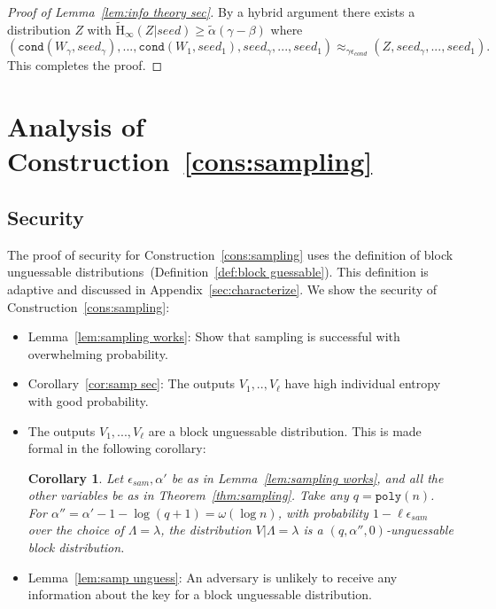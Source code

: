 \documentclass[11pt]{article}
\newcommand{\apref}[1]{\mbox{Appendix~\ref{#1}}}
\newcommand{\thref}[1]{\mbox{Theorem~\ref{#1}}}
\newcommand{\defref}[1]{\mbox{Definition~\ref{#1}}}
\newcommand{\corref}[1]{\mbox{Corollary~\ref{#1}}}
\newcommand{\lemref}[1]{\mbox{Lemma~\ref{#1}}}
\newcommand{\consref}[1]{\mbox{Construction~\ref{#1}}}
\newcommand{\class}[1]{{\ensuremath{\mathsf{#1}}}}
\newcommand{\sketch}{\ensuremath{\class{SS}}\xspace}
\newcommand{\rec}{\ensuremath{\class{Rec}}\xspace}
\newcommand{\poly}{\ensuremath{\mathtt{poly}}\xspace}
\newcommand{\Hav}{\tilde{\mathrm{H}}_\infty}
\newcommand{\cond}{\ensuremath{\mathtt{cond}}}
\newtheorem{corollary}[theorem]{Corollary}
\begin{document}
\begin{proof}[Proof of \lemref{lem:info theory sec}]
\noindent
By a hybrid argument there exists a distribution $Z$ with $\Hav(Z | seed) \ge \tilde{\alpha}(\gamma -\beta)$ where 
\[
(\cond(W_\gamma, seed_\gamma), ..., \cond(W_1, seed_1), seed_\gamma,..., seed_1) \approx_{\gamma \epsilon_{cond}} (Z, seed_\gamma,...,  seed_1).\]
This completes the proof.
\end{proof}

\section{Analysis of \consref{cons:sampling}}
\label{sec:analysis sampling}
\subsection{Security}
The proof of security for \consref{cons:sampling} uses the definition of block unguessable distributions~(\defref{def:block guessable}).  This definition is adaptive and discussed in \apref{sec:characterize}.  
We show the security of \consref{cons:sampling}:
\begin{itemize}
\item \lemref{lem:sampling works}: Show that sampling is successful with overwhelming probability.
\item \corref{cor:samp sec}: The outputs $V_1,.., V_\ell$ have high individual entropy with good probability.
\item The outputs $V_1,..., V_\ell$ are a block unguessable distribution.  This is made formal in the following corollary:
\begin{corollary}
\label{cor:v are unguessable}
Let $\epsilon_{sam}, \alpha'$ be as in \lemref{lem:sampling works},  and all the other variables be as in \thref{thm:sampling}. Take any $q=\poly(n)$.  For $\alpha'' =\alpha'-1-\log (q+1) =  \omega(\log n)$, with  probability $1-\ell \epsilon_{sam}$ over the choice of $\Lambda=\lambda$, the distribution $V| \Lambda=\lambda$ is a $(q, \alpha'', 0)$-unguessable block distribution.
\end{corollary}
\item \lemref{lem:samp unguess}: An adversary is unlikely to receive any information about the key for a block unguessable distribution.
\end{itemize}
\end{document}
